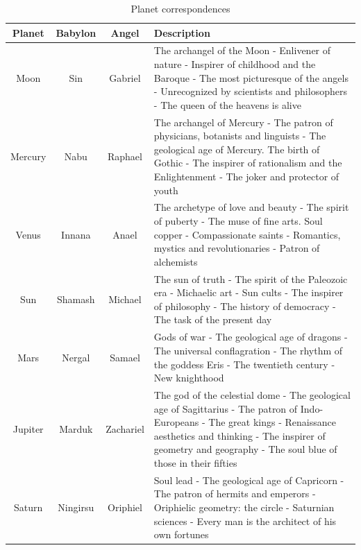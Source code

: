 \begin{longtable}[]{@{}cccp{}@{}}
\caption{Planet correspondences}
\label{tab:PlanetCorrespondences}\\
\toprule
\textbf{Planet} & \textbf{Babylon} & \textbf{Angel} & \textbf{Description} \\
\midrule
\endhead

Moon & Sin & Gabriel & The archangel of the Moon - Enlivener of nature - Inspirer of childhood and the Baroque - The most picturesque of the angels - Unrecognized by scientists and philosophers - The queen of the heavens is alive \\

Mercury & Nabu & Raphael & The archangel of Mercury - The patron of physicians, botanists and linguists - The geological age of Mercury. The birth of Gothic - The inspirer of rationalism and the Enlightenment - The joker and protector of youth \\

Venus & Innana & Anael & The archetype of love and beauty - The spirit of puberty - The muse of fine arts. Soul copper - Compassionate saints - Romantics, mystics and revolutionaries - Patron of alchemists \\

Sun & Shamash & Michael & The sun of truth - The spirit of the Paleozoic era - Michaelic art - Sun cults - The inspirer of philosophy - The history of democracy - The task of the present day \\

Mars & Nergal & Samael & Gods of war - The geological age of dragons - The universal conflagration - The rhythm of the goddess Eris - The twentieth century - New knighthood  \\

Jupiter & Marduk & Zachariel & The god of the celestial dome - The geological age of Sagittarius - The patron of Indo-Europeans - The great kings - Renaissance aesthetics and thinking - The inspirer of geometry and geography - The soul blue of those in their fifties \\

Saturn & Ningirsu & Oriphiel & Soul lead - The geological age of Capricorn - The patron of hermits and emperors - Oriphielic geometry: the circle - Saturnian sciences - Every man is the architect of his own fortunes \\

\bottomrule
\end{longtable}

